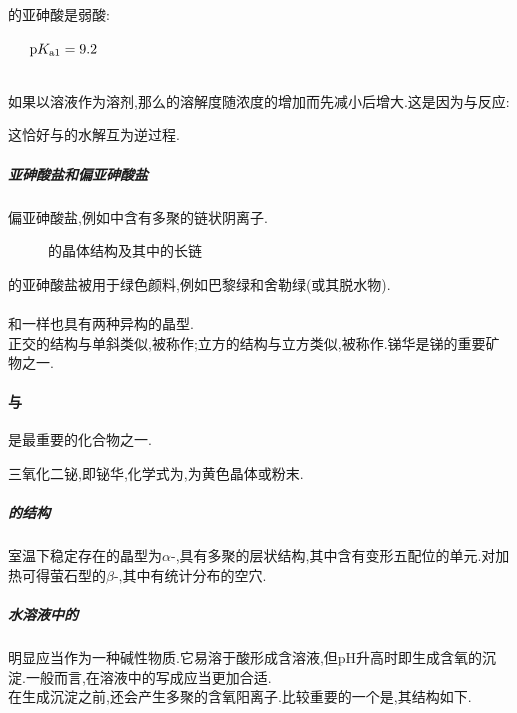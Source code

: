 \documentclass{ctexart}
\begin{document}
的亚砷酸是弱酸:
\begin{center}
    \ \ \ $\text pK_{\text a1}=9.2$\\
    \\
\end{center}
如果以溶液作为溶剂,那么的溶解度随浓度的增加而先减小后增大.这是因为与反应:
\begin{center}
\end{center}
这恰好与的水解互为逆过程.
\subparagraph{亚砷酸盐和偏亚砷酸盐}
偏亚砷酸盐,例如中含有多聚的链状阴离子.
\begin{figure}[H]
    \centering
    \caption{的晶体结构及其中的长链}
\end{figure}
的亚砷酸盐被用于绿色颜料,例如巴黎绿和舍勒绿(或其脱水物).
\paragraph{}
和一样也具有两种异构的晶型.\\
\indent 正交的结构与单斜类似,被称作;立方的结构与立方类似,被称作.锑华是锑的重要矿物之一.
\paragraph{与}
是最重要的化合物之一.
\begin{substance}
    三氧化二铋,即铋华,化学式为,为黄色晶体或粉末.
\end{substance}
\subparagraph{的结构}
室温下稳定存在的晶型为$\alpha$-,具有多聚的层状结构,其中含有变形五配位的单元.对加热可得萤石型的$\beta$-,其中有统计分布的空穴.
\subparagraph{水溶液中的}
明显应当作为一种碱性物质.它易溶于酸形成含溶液,但pH升高时即生成含氧的沉淀.一般而言,在溶液中的写成应当更加合适.\\
\indent 在生成沉淀之前,还会产生多聚的含氧阳离子.比较重要的一个是,其结构如下.
\end{document}
